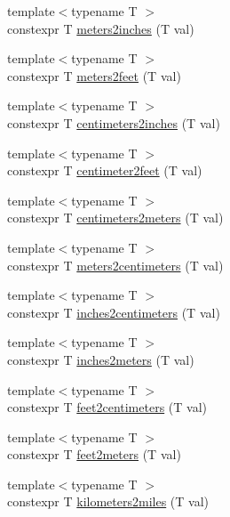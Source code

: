 \begin{DoxyCompactItemize}
\item 
{\footnotesize template$<$typename T $>$ }\\constexpr T \mbox{\hyperlink{namespacempc_1_1utilities_aa0b241eebaf3058ec563fd6be9c00009}{meters2inches}} (T val)
\item 
{\footnotesize template$<$typename T $>$ }\\constexpr T \mbox{\hyperlink{namespacempc_1_1utilities_a7976143deef719413c2ff1447d7fec42}{meters2feet}} (T val)
\item 
{\footnotesize template$<$typename T $>$ }\\constexpr T \mbox{\hyperlink{namespacempc_1_1utilities_a8852f021788cc48d045e975e16c0382f}{centimeters2inches}} (T val)
\item 
{\footnotesize template$<$typename T $>$ }\\constexpr T \mbox{\hyperlink{namespacempc_1_1utilities_ab344f73d9ed97735b823ecf6569355b1}{centimeter2feet}} (T val)
\item 
{\footnotesize template$<$typename T $>$ }\\constexpr T \mbox{\hyperlink{namespacempc_1_1utilities_a736267b7c5d34ebf9dbfd75e9b4ceccd}{centimeters2meters}} (T val)
\item 
{\footnotesize template$<$typename T $>$ }\\constexpr T \mbox{\hyperlink{namespacempc_1_1utilities_a6779c38d6af8d9946e53f061feb8d774}{meters2centimeters}} (T val)
\item 
{\footnotesize template$<$typename T $>$ }\\constexpr T \mbox{\hyperlink{namespacempc_1_1utilities_a210071ae7c4eeea2c7269246fe901ac8}{inches2centimeters}} (T val)
\item 
{\footnotesize template$<$typename T $>$ }\\constexpr T \mbox{\hyperlink{namespacempc_1_1utilities_a267f12c10d16584dbf3cb0b0ddba8bc3}{inches2meters}} (T val)
\item 
{\footnotesize template$<$typename T $>$ }\\constexpr T \mbox{\hyperlink{namespacempc_1_1utilities_a6865996c35cf22c64dcfec367de015d1}{feet2centimeters}} (T val)
\item 
{\footnotesize template$<$typename T $>$ }\\constexpr T \mbox{\hyperlink{namespacempc_1_1utilities_a20f0094ce9908b1196a4b0c93d268915}{feet2meters}} (T val)
\item 
{\footnotesize template$<$typename T $>$ }\\constexpr T \mbox{\hyperlink{namespacempc_1_1utilities_a7fca77ca1465be0d44ed1a8e003a4b6e}{kilometers2miles}} (T val)

\end{DoxyCompactItemize}
